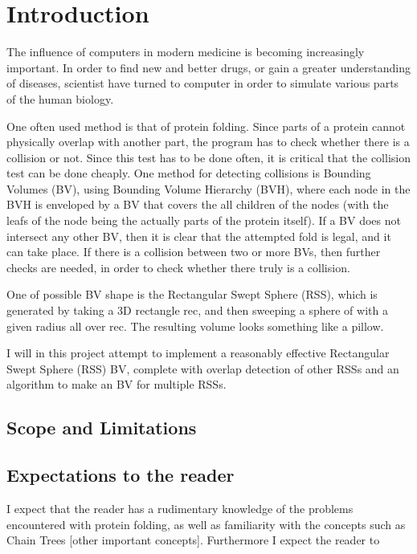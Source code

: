 
\section{Introduction}
\label{introduction}
The influence of computers in modern medicine is becoming increasingly important. In order to find new and better drugs, or gain a greater understanding of diseases, scientist have turned to computer in order to simulate various parts of the human biology.

One often used method is that of protein folding. Since parts of a protein cannot physically overlap with another part, the program has to check whether there is a collision or not. Since this test has to be done often, it is critical that the collision test can be done cheaply. 
One method for detecting collisions is Bounding Volumes (BV), using Bounding Volume Hierarchy (BVH), where each node in the BVH is enveloped by a BV that covers the all children of the nodes (with the leafs of the node being the actually parts of the protein itself). If a BV does not intersect any other BV, then it is clear that the attempted fold is legal, and it can take place. If there is a collision between two or more BVs, then further checks are needed, in order to check whether there truly is a collision.

One of possible BV shape is the Rectangular Swept Sphere (RSS), which is generated by taking a 3D rectangle rec, and then sweeping a sphere of with a  given radius all over rec. The resulting volume looks something like a pillow. 

I will in this project attempt to implement a reasonably effective Rectangular Swept Sphere (RSS) BV, complete with overlap detection of other RSSs and an algorithm to make an BV for multiple RSSs.

\subsection{Scope and Limitations}
\label{scope}

\subsection{Expectations to the reader}
I expect that the reader has a rudimentary knowledge of the problems encountered with protein folding, as well as familiarity with the concepts such as Chain Trees [other important concepts]. Furthermore I expect the reader to  

